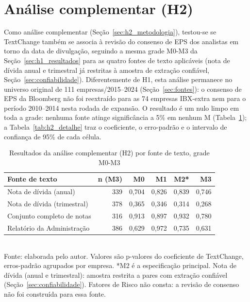\documentclass[a4paper,12pt]{report}
\begin{document}
\section{Análise complementar (H2)}
\label{sec:h2_resultados}

Como análise complementar (Seção~\ref{sec:h2_metodologia}), testou-se se TextChange também se associa à revisão do consenso de EPS dos analistas em torno da data de divulgação, seguindo a mesma grade M0-M3 da Seção~\ref{sec:h1_resultados} para as quatro fontes de texto aplicáveis (nota de dívida anual e trimestral já restritas à amostra de extração confiável, Seção~\ref{sec:confiabilidade}). Diferentemente de H1, esta análise permanece no universo original de 111 empresas/2015--2024 (Seção~\ref{sec:fontes}): o consenso de EPS da Bloomberg não foi reextraído para as 74 empresas IBX-extra nem para o período 2010--2014 nesta rodada de expansão. O resultado é um nulo limpo em toda a grade: nenhuma fonte atinge significância a 5\% em nenhum M (Tabela~\ref{tab:h2}); a Tabela~\ref{tab:h2_detalhe} traz o coeficiente, o erro-padrão e o intervalo de confiança de 95\% de cada célula.

\begin{table}[htbp]
    \centering
    \caption{Resultados da análise complementar (H2) por fonte de texto, grade M0-M3}
    \label{tab:h2}
    \small
    \begin{tabular}{@{}lrrrrr@{}}
        \toprule
        \textbf{Fonte de texto} & \textbf{n (M3)} & \textbf{M0} & \textbf{M1} & \textbf{M2*} & \textbf{M3} \\
        \midrule
        Nota de dívida (anual)       & 339 & 0,704 & 0,826 & 0,839 & 0,746 \\
        Nota de dívida (trimestral)  & 378 & 0,365 & 0,346 & 0,314 & 0,268 \\
        Conjunto completo de notas   & 316 & 0,913 & 0,897 & 0,932 & 0,780 \\
        Relatório da Administração   & 386 & 0,629 & 0,972 & 0,735 & 0,631 \\
        \bottomrule
    \end{tabular}
    \\[0.3cm]
    {\footnotesize Fonte: elaborada pelo autor. Valores são p-valores do coeficiente de TextChange, erros-padrão agrupados por empresa. *M2 é a especificação principal. Nota de dívida (anual e trimestral): amostra restrita a pares com extração confiável (Seção~\ref{sec:confiabilidade}). Fatores de Risco não consta: a revisão de consenso não foi construída para essa fonte.}
\end{table}
\end{document}
